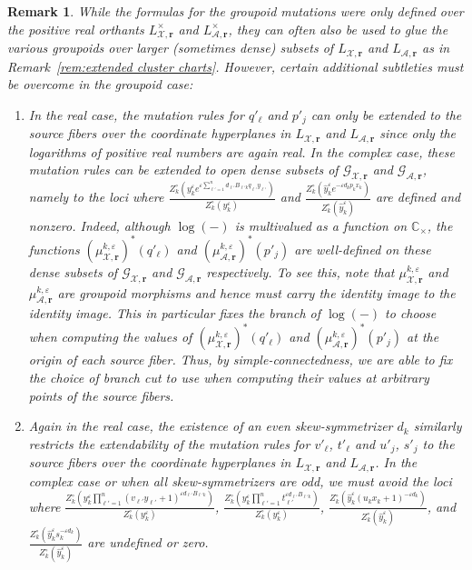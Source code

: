\documentclass{amsart}
\newtheorem{remark}[theorem]{Remark}
\numberwithin{equation}{section}
\newcommand{\bfr}{{\boldsymbol{r}}}
\newcommand{\cA}{\mathcal{A}}
\newcommand{\cG}{\mathcal{G}}
\newcommand{\cX}{\mathcal{X}}
\newcommand{\CC}{\mathbb{C}}
\begin{document}
\begin{remark}
  \label{rem:extended groupoid charts}
  While the formulas for the groupoid mutations were only defined over the positive real orthants $L^\times_{\cX,\bfr}$ and $L^\times_{\cA,\bfr}$, they can often also be used to glue the various groupoids over larger (sometimes dense) subsets of $L_{\cX,\bfr}$ and $L_{\cA,\bfr}$ as in Remark~\ref{rem:extended cluster charts}.
  However, certain additional subtleties must be overcome in the groupoid case:
  \begin{enumerate}
    \item In the real case, the mutation rules for $q'_\ell$ and $p'_j$ can only be extended to the source fibers over the coordinate hyperplanes in $L_{\cX,\bfr}$ and $L_{\cA,\bfr}$ since only the logarithms of positive real numbers are again real.
      In the complex case, these mutation rules can be extended to open dense subsets of $\cG_{\cX,\bfr}$ and $\cG_{\cA,\bfr}$, namely to the loci where $\frac{Z_k^\circ\left(y_k^\varepsilon e^{\varepsilon\sum_{\ell'=1}^n d_{\ell'} B_{\ell' k}q_{\ell'} y_{\ell'}}\right)}{Z_k^\circ(y_k^\varepsilon)}$ and $\frac{Z_k^\circ\left(\hat y_k^\varepsilon e^{-\varepsilon d_kp_kx_k}\right)}{Z_k^\circ(\hat y_k^\varepsilon)}$ are defined and nonzero.
      Indeed, although $\log(-)$ is multivalued as a function on $\CC_\times$, the functions $(\mu_{\cX,\bfr}^{k,\varepsilon})^*(q'_\ell)$ and $(\mu_{\cA,\bfr}^{k,\varepsilon})^*(p'_j)$ are well-defined on these dense subsets of $\cG_{\cX,\bfr}$ and $\cG_{\cA,\bfr}$ respectively.
      To see this, note that $\mu_{\cX,\bfr}^{k,\varepsilon}$ and $\mu_{\cA,\bfr}^{k,\varepsilon}$ are groupoid morphisms and hence must carry the identity image to the identity image.
      This in particular fixes the branch of $\log(-)$ to choose when computing the values of $(\mu_{\cX,\bfr}^{k,\varepsilon})^*(q'_\ell)$ and $(\mu_{\cA,\bfr}^{k,\varepsilon})^*(p'_j)$ at the origin of each source fiber.
      Thus, by simple-connectedness, we are able to fix the choice of branch cut to use when computing their values at arbitrary points of the source fibers. 
    \item Again in the real case, the existence of an even skew-symmetrizer $d_k$ similarly restricts the extendability of the mutation rules for $v'_\ell$, $t'_\ell$ and $u'_j$, $s'_j$ to the source fibers over the coordinate hyperplanes in $L_{\cX,\bfr}$ and $L_{\cA,\bfr}$.
      In the complex case or when all skew-symmetrizers are odd, we must avoid the loci where $\frac{Z_k^\circ\left(y_k^\varepsilon \prod_{\ell'=1}^n (v_{\ell'} y_{\ell'} + 1)^{\varepsilon d_{\ell'} B_{\ell' k}}\right)}{Z_k^\circ(y_k^\varepsilon)}$, $\frac{Z_k^\circ\left(y_k^\varepsilon \prod_{\ell'=1}^n t_{\ell'}^{\varepsilon d_{\ell'} B_{\ell' k}}\right)}{Z_k^\circ(y_k^\varepsilon)}$, $\frac{Z_k^\circ\left(\hat y_k^\varepsilon (u_k x_k +1)^{-\varepsilon d_k}\right)}{Z_k^\circ(\hat y_k^\varepsilon)}$, and $\frac{Z_k^\circ\left(\hat y_k^\varepsilon s_k^{-\varepsilon d_k}\right)}{Z_k^\circ(\hat y_k^\varepsilon)}$ are undefined or zero.

\end{enumerate}
\end{remark}
\end{document}
